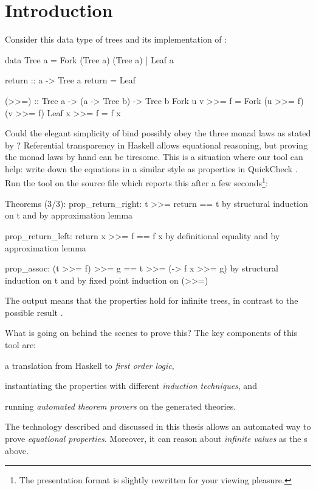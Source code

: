 
\chapter{Introduction}


Consider this data type of trees \citep{grafting} and its implementation
of  \citep{mtl}:

\begin{code}
data Tree a = Fork (Tree a) (Tree a) | Leaf a

return :: a -> Tree a
return = Leaf

(>>=) :: Tree a -> (a -> Tree b) -> Tree b
Fork u v >>= f = Fork (u >>= f) (v >>= f)
Leaf x   >>= f = f x
\end{code}

\noindent
Could the elegant simplicity of bind possibly obey the three monad
laws as stated by \cite{essenceoffp}? Referential transparency in
Haskell allows equational reasoning, but proving the monad laws by
hand can be tiresome. This is a situation where our tool can help:
write down the equations in a similar style as properties in
QuickCheck \citep{quickcheck}. Run the tool on the source file which
reports this after a few seconds\footnote{The presentation format is
  slightly rewritten for your viewing pleasure.}:


\begin{code}
Theorems (3/3):
  prop_return_right: t >>= return == t
    by structural induction on t and by approximation lemma

  prop_return_left: return x >>= f == f x
    by definitional equality and by approximation lemma

  prop_assoc: (t >>= f) >>= g == t >>= (\x -> f x >>= g)
    by structural induction on t and by fixed point induction on (>>=)
\end{code}

\noindent
The output  means that the properties hold for infinite
trees, in contrast to the possible result .

What is going on behind the scenes to prove this? The key components
of this tool are:

\begin{enumerate}
{\setlength\itemindent{18pt} \item a translation from Haskell to \emph{first order logic},}
{\setlength\itemindent{18pt} \item instantiating the properties with different \emph{induction techniques}, and}
{\setlength\itemindent{18pt} \item running \emph{automated theorem provers} on the generated theories.}
\end{enumerate}
The technology described and discussed in this thesis allows an
automated way to prove \emph{equational properties}. Moreover, it can
reason about \emph{infinite values} as the s above.

